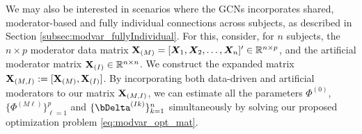 We may also be interested in scenarios where the GCNs incorporates shared, moderator-based and fully individual connections across subjects, as described in Section \ref{subsec:modvar_fullyIndividual}. For this, consider, for $n$ subjects, the $n\times p$ moderator data matrix $\mathbf{X}_{(M)} = [\bm{X}_1, \bm{X}_2,\ldots,\bm{X}_n]'\in \mathbb{R}^{n\times p}$, and the artificial moderator matrix $\mathbf{X}_{(I)}\in\mathbb{R}^{n\times n}$. We construct the expanded matrix $\mathbf{X}_{(M,I)} := [  \mathbf{X}_{(M)} , \mathbf{X}_{(I)} ]$. By incorporating both data-driven and artificial moderators to our matrix $\mathbf{X}_{(M,I)}$, we can estimate all the parameters $\Phi^{(0)}$, $\{\Phi^{(M\ell)}\}_{\ell = 1}^p$ and $\{\bDelta^{(Ik)}\}_{k=1}^n$ simultaneously by solving our proposed optimization problem \eqref{eq:modvar_opt_mat}.

